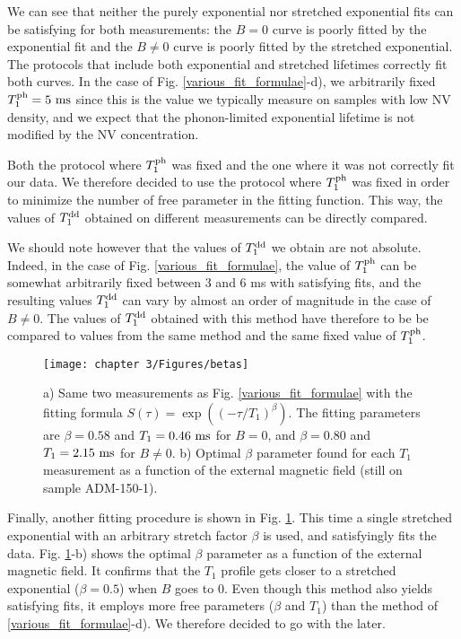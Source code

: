 \documentclass[a4paper, 11pt]{book}
\begin{document}
We can see that neither the purely exponential nor stretched exponential fits can be satisfying for both measurements: the $B=0$ curve is poorly fitted by the exponential fit and the $B \neq 0$ curve is poorly fitted by the stretched exponential. The protocols that include both exponential and stretched lifetimes correctly fit both curves. In the case of Fig. \ref{various_fit_formulae}-d), we arbitrarily fixed $T_1^{\rm ph}=5\ \rm ms$ since this is the value we typically measure on samples with low NV density, and we expect that the phonon-limited exponential lifetime is not modified by the NV concentration.

Both the protocol where $T_1^{\rm ph}$ was fixed and the one where it was not correctly fit our data. We therefore decided to use the protocol where $T_1^{\rm ph}$ was fixed in order to minimize the number of free parameter in the fitting function. This way, the values of $T_1^{\rm dd}$ obtained on different measurements can be directly compared. 

We should note however that the values of $T_1^{\rm dd}$ we obtain are not absolute. Indeed, in the case of Fig. \ref{various_fit_formulae}, the value of $T_1^{\rm ph}$ can be somewhat arbitrarily fixed between 3 and 6 ms with satisfying fits, and the resulting values $T_1^{\rm dd}$ can vary by almost an order of magnitude in the case of $B\neq0$. The values of $T_1^{\rm dd}$ obtained with this method have therefore to be be compared to values from the same method and the same fixed value of $T_1^{\rm ph}$.

\begin{figure}[h]
\centering
\texttt{[image: chapter 3/Figures/betas]}
\caption{a) Same two measurements as Fig. \ref{various_fit_formulae} with the fitting formula $S(\tau)=\exp ((-\tau/T_1)^{\beta})$. The fitting parameters are $\beta=0.58$ and $T_1=0.46\ \rm ms$ for $B=0$, and $\beta=0.80$ and $T_1=2.15\ \rm ms$ for $B\neq0$. b) Optimal $\beta$ parameter found for each $T_1$ measurement as a function of the external magnetic field (still on sample ADM-150-1).}
\label{betas}
\end{figure}

Finally, another fitting procedure is shown in Fig. \ref{betas}. This time a single stretched exponential with an arbitrary stretch factor $\beta$ is used, and satisfyingly fits the data. Fig. \ref{betas}-b) shows the optimal $\beta$ parameter as a function of the external magnetic field. It confirms that the $T_1$ profile gets closer to a stretched exponential ($\beta=0.5$) when $B$ goes to 0. Even though this method also yields satisfying fits, it employs more free parameters ($\beta$ and $T_1$) than the method of \ref{various_fit_formulae}-d). We therefore decided to go with the later.
\end{document}
